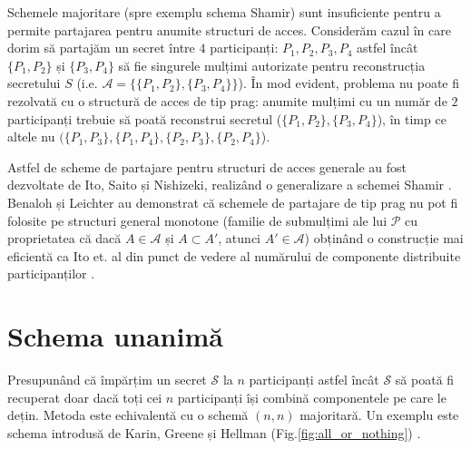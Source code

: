 \documentclass[oneside, 12pt]{book}
\begin{document}
Schemele majoritare (spre exemplu schema Shamir) sunt insuficiente pentru a permite partajarea pentru anumite structuri de acces. Considerăm cazul în care dorim să partajăm un secret între $4$ participanți: $P_1, P_2, P_3, P_4$ astfel încât $\{P_1,P_2\}$ și $\{P_3,P_4\}$ să fie singurele mulțimi autorizate pentru reconstrucția secretului $S$ (i.e. $\mathcal{A} = \{ \{P_1,P_2\}, \{P_3,P_4\} \}$). În mod evident, problema nu poate fi rezolvată cu o structură de acces de tip prag: anumite mulțimi cu un număr de $2$ participanți trebuie să poată reconstrui secretul ($ \{P_1,P_2\}, \{P_3,P_4\} $), în timp ce altele nu $( \{P_1,P_3\}, \{P_1,P_4\}, \{P_2,P_3\}, \{P_2,P_4\} $).

Astfel de scheme de partajare pentru structuri de acces generale au fost dezvoltate de Ito, Saito și Nishizeki, realizând o generalizare a schemei Shamir \cite{ITO:1989}.
Benaloh și Leichter au demonstrat că schemele de partajare de tip prag nu pot fi folosite pe structuri general monotone (familie de submulțimi ale lui $\mathcal{P}$ cu proprietatea că dacă $A \in \mathcal{A}$ și $A \subset A'$, atunci $A' \in \mathcal{A}$) obținând o construcție mai eficientă ca Ito et. al din punct de vedere al numărului de componente distribuite participanților \cite{JJ:1990}.

\section{Schema unanimă}

Presupunând că împărțim un secret $\mathcal{S}$ la $n$ participanți astfel încât $\mathcal{S}$ să poată fi recuperat doar dacă toți cei $n$ participanți își combină componentele pe care le dețin. Metoda este echivalentă cu o schemă $(n, n)$ majoritară. Un exemplu este schema introdusă de Karin, Greene și Hellman (Fig.\ref{fig:all_or_nothing}) \cite{Karnin:83}.
\end{document}

